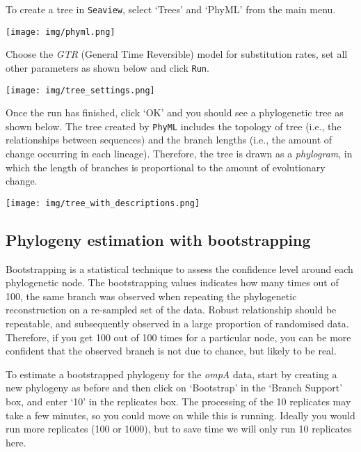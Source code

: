 \documentclass[11pt]{article}
\begin{document}
To create a tree in \texttt{Seaview}, select `Trees' and `PhyML' from
the main menu.


\begin{center}
\texttt{[image: img/phyml.png]}
\end{center}


    Choose the \textit{GTR} (General Time Reversible) model for substitution
rates, set all other parameters as shown below and click \texttt{Run}.


\begin{center}
\texttt{[image: img/tree\_settings.png]}
\end{center}


    Once the run has finished, click `OK' and you should see a phylogenetic
tree as shown below. The tree created by \texttt{PhyML} includes the
topology of tree (i.e., the relationships between sequences) and the
branch lengths (i.e., the amount of change occurring in each lineage).
Therefore, the tree is drawn as a \textit{phylogram}, in which the length
of branches is proportional to the amount of evolutionary change.


\begin{center}
\texttt{[image: img/tree\_with\_descriptions.png]}
\end{center}


    \hypertarget{phylogeny-estimation-with-bootstrapping}{%
\subsection{Phylogeny estimation with
bootstrapping}\label{phylogeny-estimation-with-bootstrapping}}

Bootstrapping is a statistical technique to assess the confidence level
around each phylogenetic node. The bootstrapping values indicates how
many times out of 100, the same branch was observed when repeating the
phylogenetic reconstruction on a re-sampled set of the data. Robust
relationship should be repeatable, and subsequently observed in a large
proportion of randomised data. Therefore, if you get 100 out of 100
times for a particular node, you can be more confident that the observed
branch is not due to chance, but likely to be real.

To estimate a bootstrapped phylogeny for the \textit{ompA} data, start by
creating a new phylogeny as before and then click on `Bootstrap' in the
`Branch Support' box, and enter `10' in the replicates box. The
processing of the 10 replicates may take a few minutes, so you could
move on while this is running. Ideally you would run more replicates
(100 or 1000), but to save time we will only run 10 replicates here.
\end{document}
